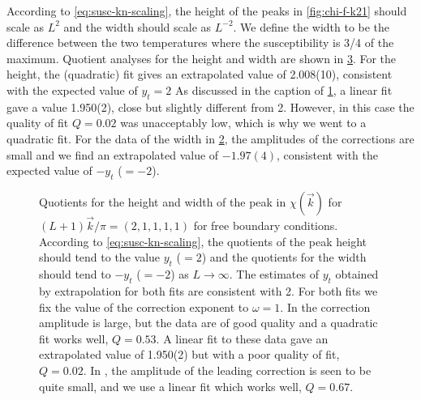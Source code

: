 According to \cref{eq:susc-kn-scaling}, the height of the peaks in
\cref{fig:chi-f-k21} should scale as $L^2$ and the width should scale as
$L^{-2}$. We define the width to be the difference between the two temperatures
where the susceptibility is 3/4 of the maximum. Quotient analyses for the
height and width are shown in \cref{fig:quots-k21}. For the height, the
(quadratic) fit gives an extrapolated value of 2.008(10), consistent with the
expected value of $y_t=2$ As discussed in the caption of \cref{fig:qchiTL-k21},
a linear fit gave a value 1.950(2), close but slightly different from 2.
However, in this case the quality of fit $Q=0.02$ was unacceptably low, which
is why we went to a quadratic fit. For the data of the width in
\cref{fig:qwidth-k21}, the amplitudes of the corrections are small and we find
an extrapolated value of $-1.97(4)$, consistent with the expected value of
$-y_t$ ($=-2$).
\begin{figure}
  \centering
  \begin{subfigure}{0.49\textwidth}
    \centering
    
    \subcaption{}\label{fig:qchiTL-k21}
  \end{subfigure}
  \begin{subfigure}{0.49\textwidth}
    \centering
    
    \subcaption{}\label{fig:qwidth-k21}
  \end{subfigure}
  \caption[
    Quotient estimates of the rounding exponent $y_t$ for $\vec{k}\neq\vec{0}$
    modes of the five-dimensional Ising model with free boundary conditions.
  ]
  {
    Quotients for the height  and width
     of the peak in $\chi(\vec{k})$ for
    $(L+1)\vec{k}/\pi=(2,1,1,1,1)$ for free boundary conditions. According to
    \cref{eq:susc-kn-scaling}, the quotients of the peak height should
    tend to the value $y_t$ ($=2$) and the quotients for the width should tend
    to $-y_t$ ($=-2$) as $L\to\infty$. The estimates of $y_t$ obtained by
    extrapolation for both fits are consistent with 2. For both fits we fix the
    value of the correction exponent to $\omega=1$. In 
    the correction amplitude is large, but the data are of good quality and a
    quadratic fit works well, $Q=0.53$. A linear fit to these data gave an
    extrapolated value of 1.950(2) but with a poor quality of fit, $Q=0.02$. In
    , the amplitude of the leading correction is seen to
    be quite small, and we use a linear fit which works well, $Q=0.67$.
  }
  \label{fig:quots-k21}
\end{figure}

